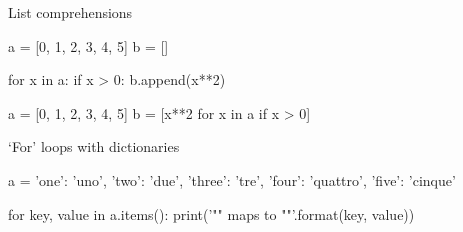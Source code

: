\begin{frame}[fragile]{List comprehensions}
    \begin{py3}
        a = [0, 1, 2, 3, 4, 5]
        b = []

        for x in a:
            if x > 0:
                b.append(x**2)
    \end{py3}
    \vfill
    \begin{py3}
        a = [0, 1, 2, 3, 4, 5]
        b = [x**2 for x in a if x > 0]
    \end{py3}
\end{frame}

\begin{frame}[fragile]{`For' loops with dictionaries}
    \begin{py3}
        a = {
            'one': 'uno',
            'two': 'due',
            'three': 'tre',
            'four': 'quattro',
            'five': 'cinque'
        }

        for key, value in a.items():
            print('"{}" maps to "{}"'.format(key, value))
    \end{py3}
\end{frame}

